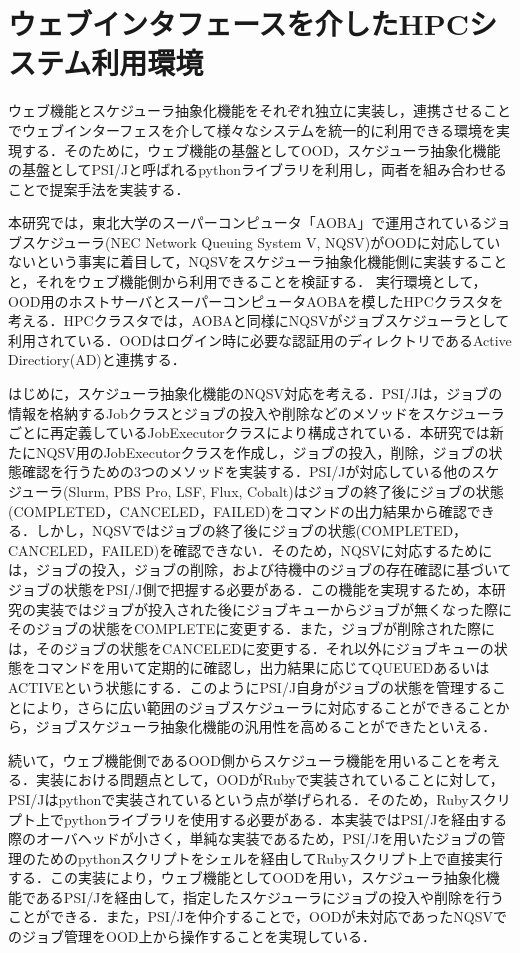 \documentclass[a4paper,oneside,twocolumn,notitlepage,dvipdfmx]{jsarticle}
\begin{document}
\section{ウェブインタフェースを介したHPCシステム利用環境}
ウェブ機能とスケジューラ抽象化機能をそれぞれ独立に実装し，連携させることでウェブインターフェスを介して様々なシステムを統一的に利用できる環境を実現する．そのために，ウェブ機能の基盤としてOOD，スケジューラ抽象化機能の基盤としてPSI/J\cite{citation_6}と呼ばれるpythonライブラリを利用し，両者を組み合わせることで提案手法を実装する．\par
本研究では，東北大学のスーパーコンピュータ「AOBA」で運用されているジョブスケジューラ(NEC Network Queuing System V, NQSV)がOODに対応していないという事実に着目して，NQSVをスケジューラ抽象化機能側に実装することと，それをウェブ機能側から利用できることを検証する．
実行環境として，OOD用のホストサーバとスーパーコンピュータAOBAを模したHPCクラスタを考える．HPCクラスタでは，AOBAと同様にNQSVがジョブスケジューラとして利用されている．OODはログイン時に必要な認証用のディレクトリであるActive Directiory(AD)と連携する．\par
はじめに，スケジューラ抽象化機能のNQSV対応を考える．PSI/Jは，ジョブの情報を格納するJobクラスとジョブの投入や削除などのメソッドをスケジューラごとに再定義しているJobExecutorクラスにより構成されている．本研究では新たにNQSV用のJobExecutorクラスを作成し，ジョブの投入，削除，ジョブの状態確認を行うための3つのメソッドを実装する．PSI/Jが対応している他のスケジューラ(Slurm, PBS Pro, LSF, Flux, Cobalt)はジョブの終了後にジョブの状態(COMPLETED，CANCELED，FAILED)をコマンドの出力結果から確認できる．しかし，NQSVではジョブの終了後にジョブの状態(COMPLETED，CANCELED，FAILED)を確認できない．そのため，NQSVに対応するためには，ジョブの投入，ジョブの削除，および待機中のジョブの存在確認に基づいてジョブの状態をPSI/J側で把握する必要がある．この機能を実現するため，本研究の実装ではジョブが投入された後にジョブキューからジョブが無くなった際にそのジョブの状態をCOMPLETEに変更する．また，ジョブが削除された際には，そのジョブの状態をCANCELEDに変更する．それ以外にジョブキューの状態をコマンドを用いて定期的に確認し，出力結果に応じてQUEUEDあるいはACTIVEという状態にする．このようにPSI/J自身がジョブの状態を管理することにより，さらに広い範囲のジョブスケジューラに対応することができることから，ジョブスケジューラ抽象化機能の汎用性を高めることができたといえる．\par
続いて，ウェブ機能側であるOOD側からスケジューラ機能を用いることを考える．実装における問題点として，OODがRubyで実装されていることに対して，PSI/Jはpythonで実装されているという点が挙げられる．そのため，Rubyスクリプト上でpythonライブラリを使用する必要がある．本実装ではPSI/Jを経由する際のオーバヘッドが小さく，単純な実装であるため，PSI/Jを用いたジョブの管理のためのpythonスクリプトをシェルを経由してRubyスクリプト上で直接実行する．この実装により，ウェブ機能としてOODを用い，スケジューラ抽象化機能であるPSI/Jを経由して，指定したスケジューラにジョブの投入や削除を行うことができる．また，PSI/Jを仲介することで，OODが未対応であったNQSVでのジョブ管理をOOD上から操作することを実現している．\par
\end{document}
